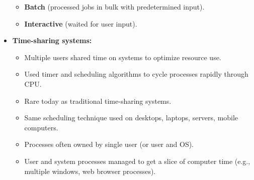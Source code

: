 \documentclass{article}
\begin{document}
\begin{itemize}
    \begin{itemize}
        \item \textbf{Batch} (processed jobs in bulk with predetermined input).
        \item \textbf{Interactive} (waited for user input).
    \end{itemize}
    \item \textbf{Time-sharing systems:}
    \begin{itemize}
        \item Multiple users shared time on systems to optimize resource use.
        \item Used timer and scheduling algorithms to cycle processes rapidly through CPU.
        \item Rare today as traditional time-sharing systems.
        \item Same scheduling technique used on desktops, laptops, servers, mobile computers.
        \item Processes often owned by single user (or user and OS).
        \item User and system processes managed to get a slice of computer time (e.g., multiple windows, web browser processes).
    \end{itemize}
\end{itemize}
\end{document}
